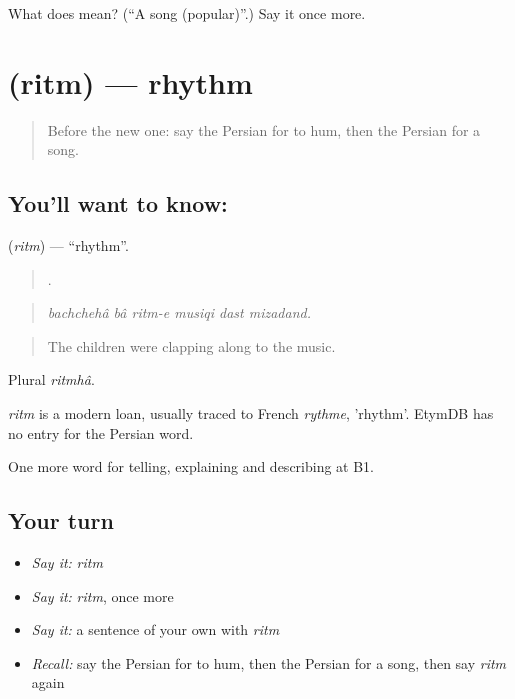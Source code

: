 \begin{tcolorbox}[breakable,colback=teal!4,colframe=teal!35!black,title={Before you move on}]
What does  mean? (\textquotedblleft{}A song (popular)\textquotedblright{}.) Say it once more.
\end{tcolorbox}
\section[\texorpdfstring{\fa{ریتم} (ritm)}{ریتم (ritm)}]{ (ritm) — rhythm}

\label{lesson:FA-C519-ritm}



\begin{quote}
Before the new one: say the Persian for to hum, then the Persian for a song.
\end{quote}

\subsection*{You'll want to know: }
\textbf{} (\emph{ritm}) — \textquotedblleft{}rhythm\textquotedblright{}.

\begin{quote}
      .
\end{quote}

\begin{quote}
\emph{bachchehâ bâ ritm-e musiqi dast mizadand.}
\end{quote}

\begin{quote}
The children were clapping along to the music.
\end{quote}

Plural \emph{ritmhâ}.

\begin{cousinweb}
\emph{ritm} is a modern loan, usually traced to French \emph{rythme}, 'rhythm'. EtymDB has no entry for the Persian word.
\end{cousinweb}

\begin{grammarlens}[title={What you've built}]
One more word for telling, explaining and describing at B1.
\end{grammarlens}

\subsection*{Your turn}
\begin{itemize}
\raggedright
  \item \emph{Say it:} \emph{ritm}
  \item \emph{Say it:} \emph{ritm}, once more
  \item \emph{Say it:} a sentence of your own with \emph{ritm}
  \item \emph{Recall:} say the Persian for to hum, then the Persian for a song, then say \emph{ritm} again
\end{itemize}

